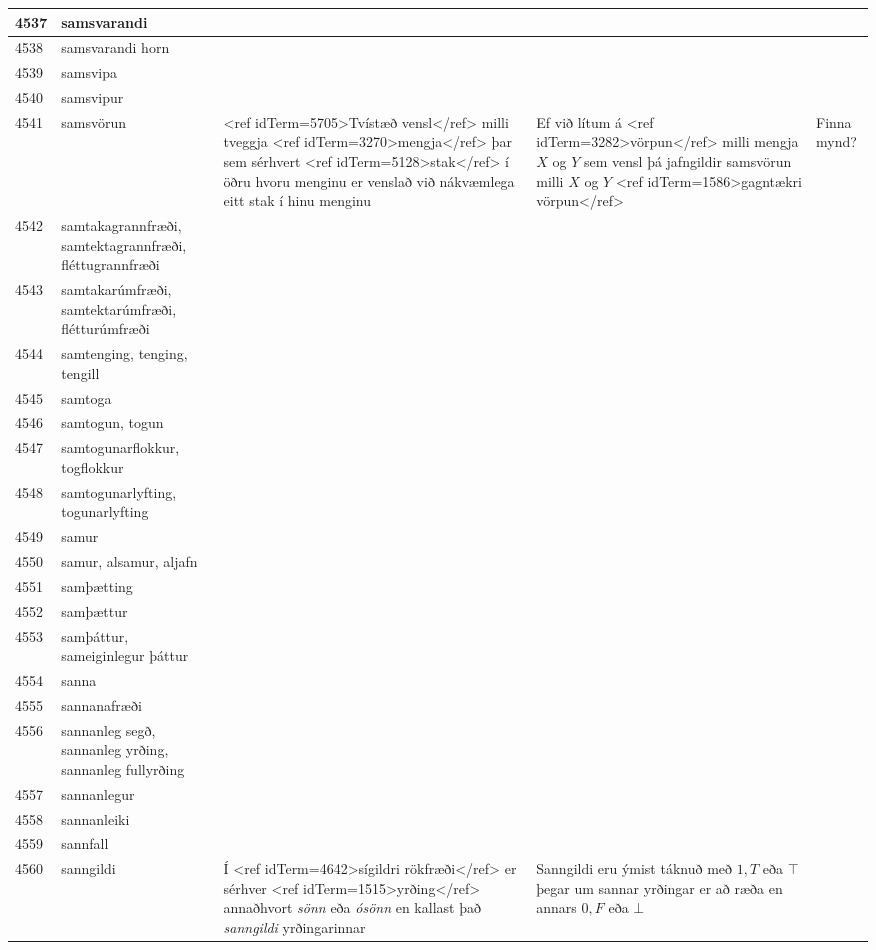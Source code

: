 \begin{longtable}{p{}|p{}|p{}|p{}|p{}}
\hline
4537 & samsvarandi &  &  &  \\
\hline
4538 & samsvarandi horn &  &  &  \\
\hline
4539 & samsvipa &  &  &  \\
\hline
4540 & samsvipur &  &  &  \\
\hline
4541 & samsvörun & <ref idTerm=5705>Tvístæð vensl</ref> milli tveggja <ref idTerm=3270>mengja</ref> þar sem sérhvert <ref idTerm=5128>stak</ref> í öðru hvoru menginu er venslað við nákvæmlega eitt stak í hinu menginu & Ef við lítum á <ref idTerm=3282>vörpun</ref> milli mengja $X$ og $Y$ sem vensl þá jafngildir samsvörun milli $X$ og $Y$ <ref idTerm=1586>gagntækri vörpun</ref> & Finna mynd? \\
\hline
4542 & samtakagrannfræði, samtektagrannfræði, fléttugrannfræði &  &  &  \\
\hline
4543 & samtakarúmfræði, samtektarúmfræði, flétturúmfræði &  &  &  \\
\hline
4544 & samtenging, tenging, tengill &  &  &  \\
\hline
4545 & samtoga &  &  &  \\
\hline
4546 & samtogun, togun &  &  &  \\
\hline
4547 & samtogunarflokkur, togflokkur &  &  &  \\
\hline
4548 & samtogunarlyfting, togunarlyfting &  &  &  \\
\hline
4549 & samur &  &  &  \\
\hline
4550 & samur, alsamur, aljafn &  &  &  \\
\hline
4551 & samþætting &  &  &  \\
\hline
4552 & samþættur &  &  &  \\
\hline
4553 & samþáttur, sameiginlegur þáttur &  &  &  \\
\hline
4554 & sanna &  &  &  \\
\hline
4555 & sannanafræði &  &  &  \\
\hline
4556 & sannanleg segð, sannanleg yrðing, sannanleg fullyrðing &  &  &  \\
\hline
4557 & sannanlegur &  &  &  \\
\hline
4558 & sannanleiki &  &  &  \\
\hline
4559 & sannfall &  &  &  \\
\hline
4560 & sanngildi & Í <ref idTerm=4642>sígildri rökfræði</ref> er sérhver <ref idTerm=1515>yrðing</ref> annaðhvort \textit{sönn} eða \textit{ósönn} en kallast það \textit{sanngildi} yrðingarinnar & Sanngildi eru ýmist táknuð með $1,T$ eða $\top$ þegar um sannar yrðingar er að ræða en annars $0,F$ eða $\bot$ & \\

\end{longtable}
